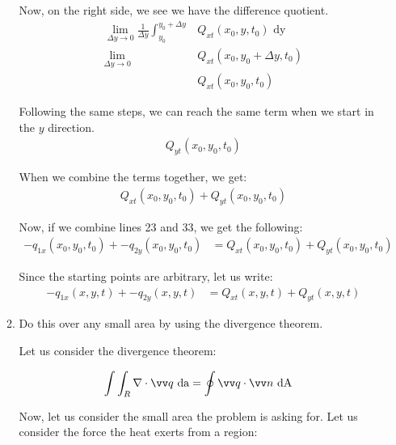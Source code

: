 \documentclass{article}
\begin{document}
\begin{enumerate}
\begin{enumerate}
    Now, on the right side, we see we have the difference quotient.
    \begin{align}
      \lim_{\Delta y \to 0}
      \frac{1}{\Delta y}
      \int^{y_0 + \Delta y}_{y_0}
      & Q_{xt}(x_0, y, t_0) \text{ dy}\\
      \lim_{\Delta y \to 0}
      & Q_{xt}(x_0, y_0 + \Delta y, t_0)\\
      & Q_{xt}(x_0, y_0, t_0)
    \end{align}

    Following the same steps, we can reach the same term when we start in the $y$ direction.
    \begin{align}
      Q_{yt}(x_0, y_0, t_0)
    \end{align}

    When we combine the terms together, we get:
    \begin{align}
      Q_{xt}(x_0, y_0, t_0) + Q_{yt}(x_0, y_0, t_0)
    \end{align}

    Now, if we combine lines 23 and 33, we get the following:
%
    \begin{align}
      -q_{1x}(x_0, y_0, t_0) +
      -q_{2y}(x_0, y_0, t_0) & =
      Q_{xt}(x_0, y_0, t_0) +
      Q_{yt}(x_0, y_0, t_0)
    \end{align}

    Since the starting points are arbitrary, let us write:
    \begin{align}
      -q_{1x}(x, y, t) +
      -q_{2y}(x, y, t) & =
      Q_{xt}(x, y, t) +
      Q_{yt}(x, y, t)
    \end{align}
    \item Do this over any small area by using the divergence theorem.

    Let us consider the divergence theorem:

    \begin{align}
      \int \int_R \grad \cdot \vv q \text{ da} & = \oint \vv q \cdot \vv n \text{ dA}
    \end{align}

    Now, let us consider the small area the problem is asking for. Let us consider the force the heat exerts from a region:


\end{enumerate}
\end{enumerate}
\end{document}
